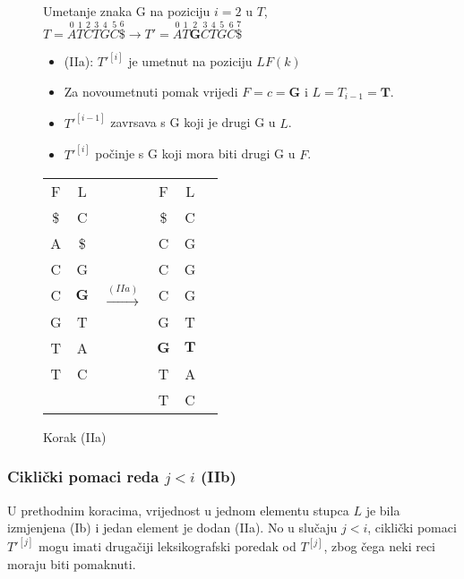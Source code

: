 \documentclass{ferseminar}
\begin{document}
\begin{figure}[H]

\begin{minipage}{0.5\textwidth}
\footnotesize
Umetanje znaka G na poziciju $i=2$ u $T$,
$
	T=\overset{0}{A}	\overset{1}{T} \overset{2}{C} \overset{3}{T}	\overset{4}{G}
	\overset{5}{C}	\overset{6}{\$} \rightarrow		
	T'=\overset{0}{A}	\overset{1}{T}	\overset{2}{\boldsymbol{G}}  \overset{3}{C} \overset{4}{T}	\overset{5}{G}
	\overset{6}{C}	\overset{7}{\$} 	
$
\begin{itemize}
  \item[] (IIa): $T'^{[i]}$ je umetnut na poziciju $LF(k)$
  \item[] Za novoumetnuti pomak vrijedi $F=c=\boldsymbol{G}$ i $L=T_{i-1}=\boldsymbol{T}$.
  \item[] $T'^{[i-1]}$ zavrsava s G koji je drugi G u $L$.
  \item[] $T'^{[i]}$ počinje s G koji mora biti drugi G u $F$.
\end{itemize}

\end{minipage} \hfill
\begin{minipage}{0.45\textwidth}
\hspace{.2\textwidth}
\begin{tabular}{cccc|cc}
	\multicolumn{1}{c|}{F} & L & & F & L \\
	\cline{1-2}	\cline{4-5}
	\multicolumn{1}{c|}{\$} & C & & \$ & C \\
	\multicolumn{1}{c|}{A} & \$ & & C & G \\
	\multicolumn{1}{c|}{C} & G &  & C & G \\
	\multicolumn{1}{c|}{C} & $\boldsymbol{G}$ & $\stackrel{(IIa)}{\longrightarrow}$ & C & G \\
	
	\multicolumn{1}{c|}{G} & T &  & G & T \\
	\cline{4-5}
	\multicolumn{1}{c|}{T} & A & & \multicolumn{1}{|c|}{$\boldsymbol{G}$} & \multicolumn{1}{c|}{$\boldsymbol{T}$} \\
	\cline{4-5}
	\multicolumn{1}{c|}{T} & C & & T & A \\
	  &   & & T & C
\end{tabular}

\end{minipage}
\caption{Korak (IIa)}
\label{slika:IIa}
\end{figure}



\subsubsection{Ciklički pomaci reda $j<i$ (IIb)}
U prethodnim koracima, vrijednost u jednom elementu stupca $L$ je bila izmjenjena (Ib) i jedan element je dodan (IIa). No u slučaju $j<i$, ciklički pomaci $T'^{[j]}$ mogu imati drugačiji leksikografski poredak od $T^{[j]}$, zbog čega neki reci moraju biti pomaknuti.
\end{document}

